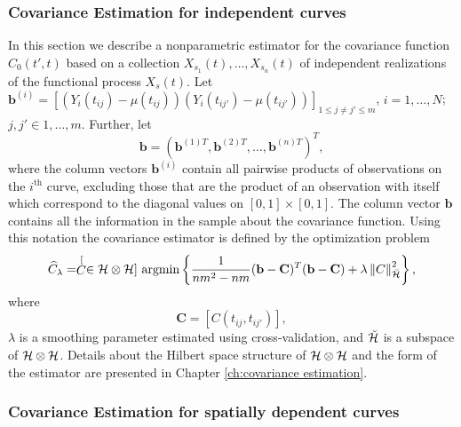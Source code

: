 \subsubsection{Covariance Estimation for independent curves} %
\label{sub:subsection_name}

In this section we describe a nonparametric estimator for the covariance function $C_0(t',t)$ based on a collection $X_{s_1}(t), \dots, X_{s_n}(t)$ of independent realizations of the functional process $X_s(t)$. Let $\mathbf{b}^{(i)} = [(Y_i(t_{ij})-\mu(t_{ij}))(Y_i(t_{ij'})-\mu(t_{ij'}))]_{1\leq j\neq j'\leq m}$, $i=1, \dots, N$; $j,j' \in 1, \dots, m$. Further, let
\begin{equation}
	\mathbf{b} = (\mathbf{b}^{(1)T}, \mathbf{b}^{(2)T}, \dots, \mathbf{b}^{(n)T} )^T, \label{b}
\end{equation} 
where the column vectors $\mathbf{b}^{(i)}$ contain all pairwise products of observations on the $i^{\mbox{th}}$ curve, excluding those that are the product of an observation with itself which correspond to the diagonal values on $[0,1]\times [0,1]$. The column vector $\mathbf{b}$ contains all the information in the sample about the covariance function. Using this notation the covariance estimator is defined by the optimization problem
\begin{equation}
	 \widehat{C}_{\lambda}=\stackrel[C \in \mathcal{H}\otimes \mathcal{H}]{}{\text{ argmin}} \left\{\frac{1}{nm^2-nm} (\mathbf{b} - \mathbf{C})^T(\mathbf{b} - \mathbf{C})+\lambda\left\Vert C\right\Vert _{\breve{\mathcal{H}}}^{2} \right\},
	 \label{kriging: cov est}
	 \end{equation}
where
\[ \mathbf{C} = [C(t_{ij}, t_{ij'})], \]
 $\lambda$ is a smoothing parameter estimated using cross-validation, and $\breve{\mathcal{H}}$ is a subspace of $\mathcal{H}\otimes\mathcal{H}$. Details about the Hilbert space structure of $\mathcal{H}\otimes\mathcal{H}$ and the form of the estimator are presented in Chapter \ref{ch:covariance estimation}. 

\subsubsection{Covariance Estimation for spatially dependent curves} %
\label{sub:weighted covariance}

